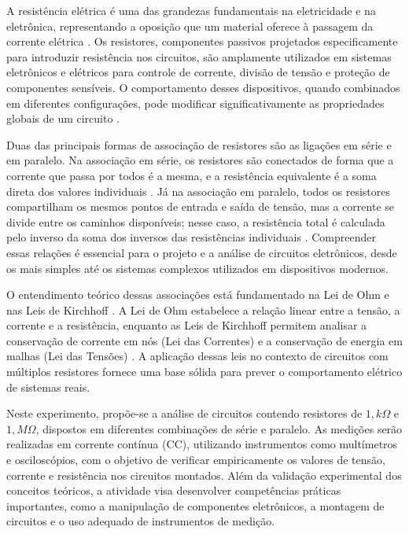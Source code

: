 \documentclass[conference]{IEEEtran}
\begin{document}

A resistência elétrica é uma das grandezas fundamentais na eletricidade e na eletrônica, representando a oposição que um material oferece à passagem da corrente elétrica \cite{hayt2019analise}. Os resistores, componentes passivos projetados especificamente para introduzir resistência nos circuitos, são amplamente utilizados em sistemas eletrônicos e elétricos para controle de corrente, divisão de tensão e proteção de componentes sensíveis. O comportamento desses dispositivos, quando combinados em diferentes configurações, pode modificar significativamente as propriedades globais de um circuito \cite{boylestad2014dispositivos}.

Duas das principais formas de associação de resistores são as ligações em série e em paralelo. Na associação em série, os resistores são conectados de forma que a corrente que passa por todos é a mesma, e a resistência equivalente é a soma direta dos valores individuais \cite{hayt2019analise}. Já na associação em paralelo, todos os resistores compartilham os mesmos pontos de entrada e saída de tensão, mas a corrente se divide entre os caminhos disponíveis; nesse caso, a resistência total é calculada pelo inverso da soma dos inversos das resistências individuais \cite{hayt2019analise}. Compreender essas relações é essencial para o projeto e a análise de circuitos eletrônicos, desde os mais simples até os sistemas complexos utilizados em dispositivos modernos.

O entendimento teórico dessas associações está fundamentado na Lei de Ohm e nas Leis de Kirchhoff \cite{halliday}. A Lei de Ohm estabelece a relação linear entre a tensão, a corrente e a resistência, enquanto as Leis de Kirchhoff permitem analisar a conservação de corrente em nós (Lei das Correntes) e a conservação de energia em malhas (Lei das Tensões) \cite{halliday}. A aplicação dessas leis no contexto de circuitos com múltiplos resistores fornece uma base sólida para prever o comportamento elétrico de sistemas reais.

Neste experimento, propõe-se a análise de circuitos contendo resistores de $1,k\Omega$ e $1,M\Omega$, dispostos em diferentes combinações de série e paralelo. As medições serão realizadas em corrente contínua (CC), utilizando instrumentos como multímetros e osciloscópios, com o objetivo de verificar empiricamente os valores de tensão, corrente e resistência nos circuitos montados. Além da validação experimental dos conceitos teóricos, a atividade visa desenvolver competências práticas importantes, como a manipulação de componentes eletrônicos, a montagem de circuitos e o uso adequado de instrumentos de medição.
\end{document}
